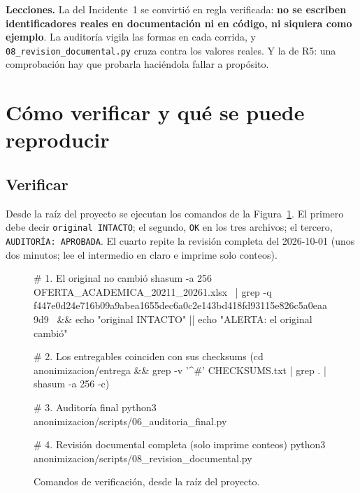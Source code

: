 \documentclass[11pt,a4paper,twoside,twocolumn]{article}
\newcommand{\cod}[1]{\nolinkurl{#1}}
\begin{document}
\begin{nota}
\textbf{\color{ustaAzul}Lecciones.} La del Incidente~1 se convirtió en regla verificada:
\textbf{no se escriben identificadores reales en documentación ni en código, ni siquiera como
ejemplo}. La auditoría vigila las formas en cada corrida, y \cod{08_revision_documental.py}
cruza contra los valores reales. Y la de R5: una comprobación hay que probarla haciéndola fallar
a propósito.
\end{nota}

\section{Cómo verificar y qué se puede reproducir}\label{sec:verificar}

\subsection{Verificar}

Desde la raíz del proyecto se ejecutan los comandos de la Figura~\ref{fig:comandos}. El primero
debe decir \texttt{original INTACTO}; el segundo, \texttt{OK} en los tres archivos; el tercero,
\texttt{AUDITORÍA: APROBADA}. El cuarto repite la revisión completa del 2026-10-01 (unos dos
minutos; lee el intermedio en claro e imprime solo conteos).

\begin{figure}[tp]
\begin{codigo}[basicstyle=\ttfamily\footnotesize]
# 1. El original no cambió
shasum -a 256 OFERTA_ACADEMICA_20211_20261.xlsx \
  | grep -q f447e0d24e716b09a9abea1655dec6a0c2e143bd418fd93115e826c5a0eaa9d9 \
  && echo "original INTACTO" || echo "ALERTA: el original cambió"

# 2. Los entregables coinciden con sus checksums
(cd anonimizacion/entrega && grep -v '^#' CHECKSUMS.txt | grep . | shasum -a 256 -c)

# 3. Auditoría final
python3 anonimizacion/scripts/06_auditoria_final.py

# 4. Revisión documental completa (solo imprime conteos)
python3 anonimizacion/scripts/08_revision_documental.py
\end{codigo}
\caption{Comandos de verificación, desde la raíz del proyecto.}
\label{fig:comandos}
\end{figure}
\end{document}
